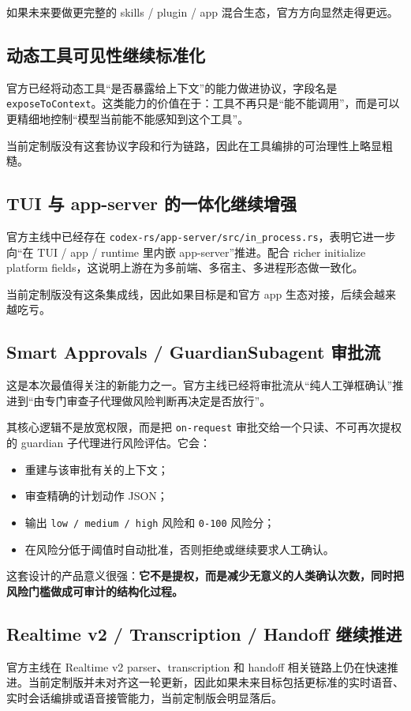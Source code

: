 \documentclass[UTF8,11pt]{ctexart}
\begin{document}
如果未来要做更完整的 skills / plugin / app 混合生态，官方方向显然走得更远。

\subsection{动态工具可见性继续标准化}
官方已经将动态工具“是否暴露给上下文”的能力做进协议，字段名是 \texttt{exposeToContext}。这类能力的价值在于：工具不再只是“能不能调用”，而是可以更精细地控制“模型当前能不能感知到这个工具”。

当前定制版没有这套协议字段和行为链路，因此在工具编排的可治理性上略显粗糙。

\subsection{TUI 与 app-server 的一体化继续增强}
官方主线中已经存在 \texttt{codex-rs/app-server/src/in\_process.rs}，表明它进一步向“在 TUI / app / runtime 里内嵌 app-server”推进。配合 richer initialize platform fields，这说明上游在为多前端、多宿主、多进程形态做一致化。

当前定制版没有这条集成线，因此如果目标是和官方 app 生态对接，后续会越来越吃亏。

\subsection{Smart Approvals / GuardianSubagent 审批流}
这是本次最值得关注的新能力之一。官方主线已经将审批流从“纯人工弹框确认”推进到“由专门审查子代理做风险判断再决定是否放行”。

其核心逻辑不是放宽权限，而是把 \texttt{on-request} 审批交给一个只读、不可再次提权的 guardian 子代理进行风险评估。它会：
\begin{itemize}[nosep]
  \item 重建与该审批有关的上下文；
  \item 审查精确的计划动作 JSON；
  \item 输出 \texttt{low / medium / high} 风险和 \texttt{0-100} 风险分；
  \item 在风险分低于阈值时自动批准，否则拒绝或继续要求人工确认。
\end{itemize}

这套设计的产品意义很强：\textbf{它不是提权，而是减少无意义的人类确认次数，同时把风险门槛做成可审计的结构化过程。}

\subsection{Realtime v2 / Transcription / Handoff 继续推进}
官方主线在 Realtime v2 parser、transcription 和 handoff 相关链路上仍在快速推进。当前定制版并未对齐这一轮更新，因此如果未来目标包括更标准的实时语音、实时会话编排或语音接管能力，当前定制版会明显落后。
\end{document}
